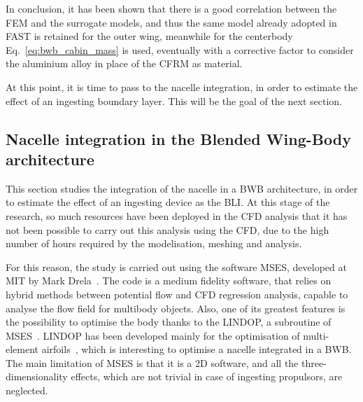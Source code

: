 In conclusion, it has been shown that there is a good correlation between the FEM and the surrogate models, and thus the same model already adopted in FAST is retained for the outer wing, meanwhile for the centerbody Eq.~\eqref{eq:bwb_cabin_mass} is used, eventually with a corrective factor to consider the aluminium alloy in place of the CFRM as material. 

At this point, it is time to pass to the nacelle integration, in order to estimate the effect of an ingesting boundary layer. 
This will be the goal of the next section. 

\subsection{Nacelle integration in the Blended Wing-Body architecture}
\label{subsec:chap4_nacelle_integration}

This section studies the integration of the nacelle in a BWB architecture, in order to estimate the effect of an ingesting device as the BLI. 
At this stage of the research, so much resources have been deployed in the CFD analysis that it has not been possible to carry out this analysis using the CFD, due to the high number of hours required by the modelisation, meshing and analysis. 

For this reason, the study is carried out using the software MSES, developed at MIT by Mark Drela~\cite{bib:mses}. 
The code is a medium fidelity software, that relies on hybrid methods between potential flow and CFD regression analysis, capable to analyse the flow field for multibody objects. 
Also, one of its greatest features is the possibility to optimise the body thanks to the LINDOP, a subroutine of MSES~\cite{bib:lindop}. 
LINDOP has been developed mainly for the optimisation of multi-element airfoils~\cite{bib:drela_1993}, which is interesting to optimise a nacelle integrated in a BWB.
The main limitation of MSES is that it is a 2D software, and all the three-dimensionality effects, which are not trivial in case of ingesting propulsors, are neglected.
 
